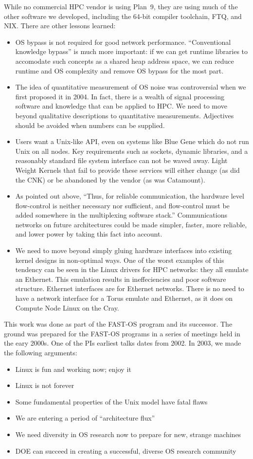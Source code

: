 \documentclass{report}
\begin{document}
While no commercial HPC vendor is using Plan~9, they are using much of the other software we developed, 
including the 64-bit compiler toolchain, FTQ, and NIX. 
There are other lessons learned: 
\begin{itemize}
\item OS bypass is not required for good network performance. ``Conventional knowledge
bypass'' is much more important: if we can get runtime libraries to accomodate 
such concepts as a shared heap address space, we can reduce runtime and OS 
complexity and remove OS bypass for the most part. 
\item The idea of quantitative measurement of OS noise was controversial when we first proposed it in 2004. 
In fact, there is a wealth of signal processing software and knowledge that can be applied to HPC. We need
to move beyond qualitative descriptions to quantitative measurements. Adjectives should be avoided
when numbers can be supplied. 
\item Users want a Unix-like API, even on systems like Blue Gene which do not run Unix on all nodes. 
Key requirements such as sockets, dynamic libraries, and a reasonably standard file system
interface can not be waved away. Light Weight Kernels that fail to provide these services
will either change (as did the CNK) or be abandoned by the vendor (as was Catamount). 
\item As pointed out above, ``Thus, for reliable communication, the hardware level flow-control is neither necessary nor sufficient, 
and flow-control must be added somewhere in the multiplexing software stack.'' Communications networks
on future architectures could be made simpler, faster, more reliable, and lower power by taking 
this fact into account. 
\item We need to move beyond simply gluing hardware interfaces into existing kernel designs in non-optimal ways. 
One of the worst examples of this tendency can be seen in the Linux drivers for HPC networks: they all emulate an Ethernet. 
This emulation results in ineffeciencies and poor software structure. Ethernet interfaces are for Ethernet networks. There is no need to have a network interface for a
Torus emulate and Ethernet, as it does on Compute Node Linux on the Cray. 
\end{itemize}

This work was done as part of the FAST-OS program and its successor. 
The ground was prepared for the FAST-OS programs in a series of meetings held in
the eary 2000s. One of the PIs earliest talks dates from 2002. In 2003, we made
the following arguments: 
\begin{itemize}
\item Linux is fun and working now; enjoy it
\item Linux is not forever
\item Some fundamental properties of the Unix model have fatal flaws
\item We are entering a period of “architecture flux” 
\item We need diversity in OS research now to prepare for new, strange machines
\item DOE can succeed in creating a successful, diverse OS research community
\end{itemize}
\end{document}
